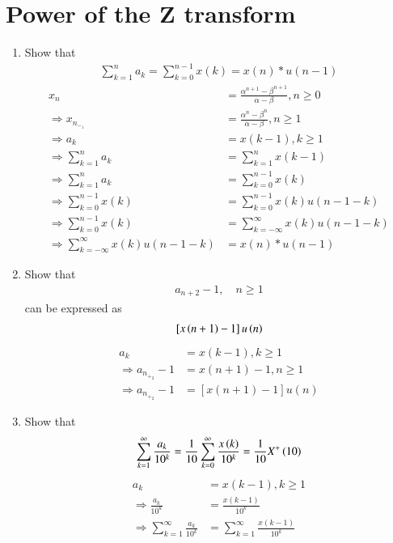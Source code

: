 \documentclass[journal,12pt,twocolumn]{IEEEtran}
\renewcommand\thesection{\arabic{section}}
\begin{document}
\section{Power of the Z transform}
\begin{enumerate}[label=\thesection.\arabic*,ref=\thesection.\theenumi]
\item Show that 
\begin{align}
	\sum_{k=1}^{n}a_k = 
	\sum_{k=0}^{n-1}x(k) = x(n)*u(n-1)
\end{align}
\solution
\begin{align}
	x_n&=\frac{\alpha^{n+1}-\beta^{n+1}}{\alpha-\beta},n \ge 0\\
	\Rightarrow x_n_-_1&=\frac{\alpha^{n}-\beta^{n}}{\alpha-\beta},n \ge 1\\
	\Rightarrow a_k&=x(k-1),k \ge 1\\
	\Rightarrow \sum_{k=1}^{n}a_k&=\sum_{k=1}^{n}x(k-1)\\
	\Rightarrow \sum_{k=1}^{n}a_k&=\sum_{k=0}^{n-1}x(k)\\
     \Rightarrow \sum_{k=0}^{n-1}x(k)&=\sum_{k=0}^{n-1}x(k)u(n-1-k)\\
	 \Rightarrow \sum_{k=0}^{n-1}x(k)&=\sum_{k=-\infty}^{\infty}x(k)u(n-1-k)\\
	 \Rightarrow \sum_{k=-\infty}^{\infty}x(k)u(n-1-k)&=x(n)*u(n-1)
\end{align}
\item Show that 
\begin{align}
a_{n+2}-1, \quad n \ge 1
\end{align}
can be expressed as 
\begin{align}
	{}\left[x\left(n+1\right)-1\right]u\left(n\right)
\end{align}
\solution
\begin{align}
	a_k&=x(k-1),k \ge 1\\
	\Rightarrow a_n_+_2-1&=x(n+1)-1,n \ge 1\\
	\Rightarrow a_n_+_2-1&=[x(n+1)-1]u(n)
\end{align}
 \item Show that 
\begin{align}
	\sum_{k=1}^{\infty}\frac{a_k}{10^k}= 
	\frac{1}{10}\sum_{k=0}^{\infty}\frac{x\left(k\right)}{10^k} =\frac{1}{10}X^{+}\left({10}\right)
\end{align}
\solution
\begin{align}
	a_k&=x(k-1),k \ge 1\\
	\Rightarrow \frac{a_k}{10^{k}}&=\frac{x(k-1)}{10^{k}}\\
	\Rightarrow \sum_{k=1}^{\infty}\frac{a_k}{10^{k}}&=\sum_{k=1}^{\infty}\frac{x(k-1)}{10^{k}}\\

\end{align}
\end{enumerate}
\end{document}
